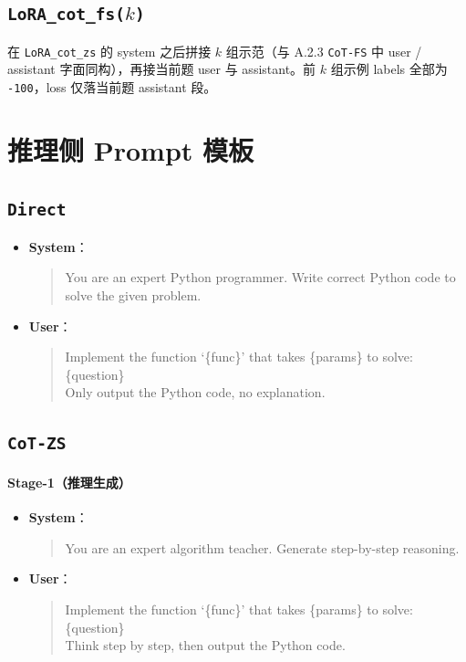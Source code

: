 \documentclass[
    decl-page,  %
  ]{njuthesis}
\begin{document}
\subsection{\texttt{LoRA\_cot\_fs($k$)}}
在 \texttt{LoRA\_cot\_zs} 的 system 之后拼接 $k$ 组示范（与 A.2.3 \texttt{CoT-FS} 中 user / assistant 字面同构），再接当前题 user 与 assistant。前 $k$ 组示例 labels 全部为 \texttt{-100}，loss 仅落当前题 assistant 段。

\section{推理侧 Prompt 模板}
\label{appendix:prompts:infer}

\subsection{\texttt{Direct}}
\begin{itemize}
    \item \textbf{System}：
\begin{quote}\ttfamily\footnotesize
You are an expert Python programmer. Write correct Python code to solve the given problem.
\end{quote}
    \item \textbf{User}：
\begin{quote}\ttfamily\footnotesize
Implement the function `\{func\}' that takes \{params\} to solve:\\[0.3em]
\{question\}\\[0.3em]
Only output the Python code, no explanation.
\end{quote}
\end{itemize}

\subsection{\texttt{CoT-ZS}}

\paragraph{Stage-1（推理生成）}
\begin{itemize}
    \item \textbf{System}：
\begin{quote}\ttfamily\footnotesize
You are an expert algorithm teacher. Generate step-by-step reasoning.
\end{quote}
    \item \textbf{User}：
\begin{quote}\ttfamily\footnotesize
Implement the function `\{func\}' that takes \{params\} to solve:\\[0.3em]
\{question\}\\[0.3em]
Think step by step, then output the Python code.
\end{quote}
\end{itemize}
\end{document}
